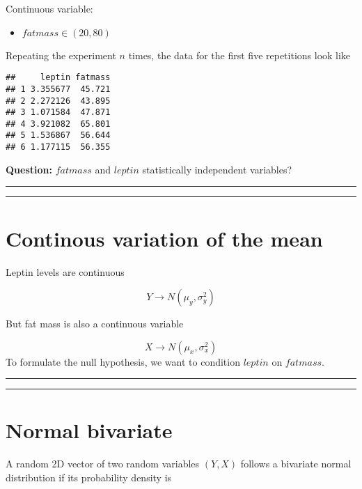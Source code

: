 \documentclass[
]{book}
\providecommand{\tightlist}{%
  \setlength{\itemsep}{0pt}\setlength{\parskip}{0pt}}
\begin{document}
Continuous variable:

\begin{itemize}
\tightlist
\item
  \(fatmass \in (20,80)\)
\end{itemize}

Repeating the experiment \(n\) times, the data for the first five repetitions look like

\begin{verbatim}
##     leptin fatmass
## 1 3.355677  45.721
## 2 2.272126  43.895
## 3 1.071584  47.871
## 4 3.921082  65.801
## 5 1.536867  56.644
## 6 1.177115  56.355
\end{verbatim}

\textbf{Question:} \(fatmass\) and \(leptin\) statistically independent variables?

\begin{center}\rule{0.5\linewidth}{0.5pt}\end{center}

\begin{center}\rule{0.5\linewidth}{0.5pt}\end{center}

\hypertarget{continous-variation-of-the-mean}{%
\section{Continous variation of the mean}\label{continous-variation-of-the-mean}}

Leptin levels are continuous

\[Y \rightarrow N(\mu_y, \sigma_{y}^2)\]

But fat mass is also a continuous variable

\[X \rightarrow N(\mu_x, \sigma_x^2)\]
To formulate the null hypothesis, we want to condition \(leptin\) on \(fatmass\).

\begin{center}\rule{0.5\linewidth}{0.5pt}\end{center}

\begin{center}\rule{0.5\linewidth}{0.5pt}\end{center}

\hypertarget{normal-bivariate}{%
\section{Normal bivariate}\label{normal-bivariate}}

A random 2D vector of two random variables \((Y, X)\) follows a bivariate normal distribution if its probability density is
\end{document}
